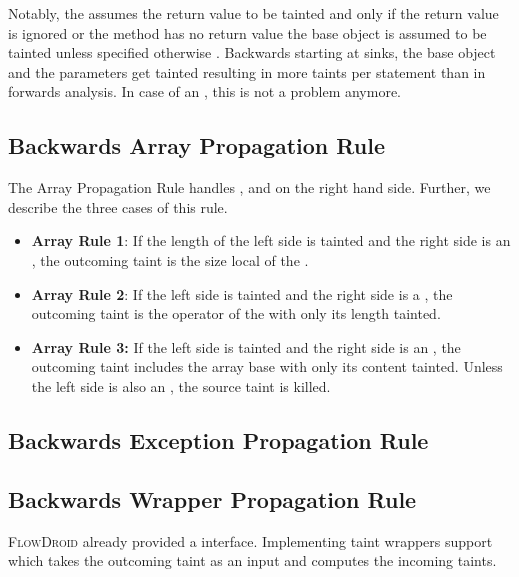 \documentclass[../draft.tex]{subfiles}
\begin{document}
    Notably, the  assumes the return value to be tainted and only if the return value is ignored or the method has no return value the base object is assumed to be tainted unless specified otherwise \cite{Arzt2017PhD}. Backwards starting at sinks, the base object and the parameters get tainted resulting in more taints per statement than in forwards analysis. In case of an , this is not a problem anymore.
    

    \subsection{Backwards Array Propagation Rule}
    The Array Propagation Rule handles ,  and  on the right hand side. Further, we describe the three cases of this rule.

    \begin{itemize}
        \item \textbf{Array Rule 1}: If the length of the left side is tainted and the right side is an , the outcoming taint is the size local of the .
        \item  \textbf{Array Rule 2}: If the left side is tainted and the right side is a , the outcoming taint is the operator of the  with only its length tainted.
        \item \textbf{Array Rule 3:} If the left side is tainted and the right side is an , the outcoming taint includes the array base with only its content tainted. Unless the left side is also an , the source taint is killed.
    \end{itemize}

    \subsection{Backwards Exception Propagation Rule}


    \subsection{Backwards Wrapper Propagation Rule}
    \textsc{FlowDroid} already provided a  interface. Implementing taint wrappers support  which takes the outcoming taint as an input and computes the incoming taints.
\end{document}
